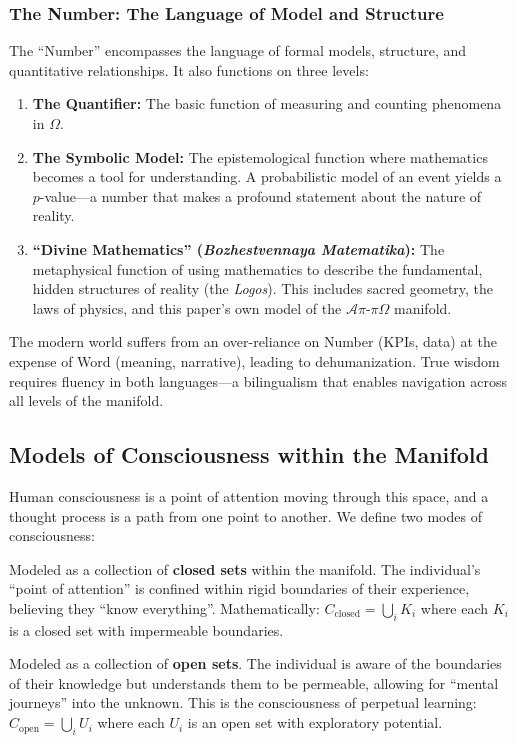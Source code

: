 \documentclass[11pt,a4paper]{article}
\begin{document}
\subsubsection{The Number: The Language of Model and Structure}
The ``Number'' encompasses the language of formal models, structure, and quantitative relationships. It also functions on three levels:

\begin{enumerate}
    \item \textbf{The Quantifier:} The basic function of measuring and counting phenomena in $\Omega$.
    \item \textbf{The Symbolic Model:} The epistemological function where mathematics becomes a tool for understanding. A probabilistic model of an event yields a $p$-value—a number that makes a profound statement about the nature of reality.
    \item \textbf{``Divine Mathematics'' (\textit{Bozhestvennaya Matematika}):} The metaphysical function of using mathematics to describe the fundamental, hidden structures of reality (the \textit{Logos}). This includes sacred geometry, the laws of physics, and this paper's own model of the $\mathcal{A}\pi\text{-}\pi\Omega$ manifold.
\end{enumerate}

The modern world suffers from an over-reliance on Number (KPIs, data) at the expense of Word (meaning, narrative), leading to dehumanization. True wisdom requires fluency in both languages—a bilingualism that enables navigation across all levels of the manifold.

\subsection{Models of Consciousness within the Manifold}
Human consciousness is a point of attention moving through this space, and a thought process is a path from one point to another. We define two modes of consciousness:

\begin{description}[style=nextline]
    \item[\textbf{Non-Socratic Consciousness}] Modeled as a collection of \textbf{closed sets} within the manifold. The individual's ``point of attention'' is confined within rigid boundaries of their experience, believing they ``know everything''. Mathematically: $C_{\text{closed}} = \bigcup_{i} K_i$ where each $K_i$ is a closed set with impermeable boundaries.
    
    \item[\textbf{Socratic Consciousness}] Modeled as a collection of \textbf{open sets}. The individual is aware of the boundaries of their knowledge but understands them to be permeable, allowing for ``mental journeys'' into the unknown. This is the consciousness of perpetual learning: $C_{\text{open}} = \bigcup_{i} U_i$ where each $U_i$ is an open set with exploratory potential.
\end{description}
\end{document}
